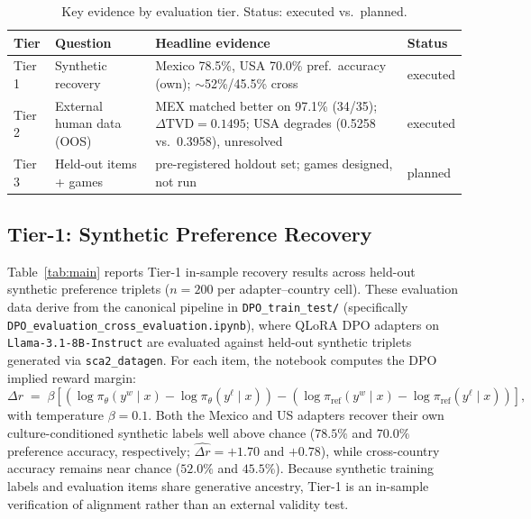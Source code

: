 \documentclass[11pt,letterpaper]{article}
\begin{document}
\begin{table}[h!]
\centering
\caption{Key evidence by evaluation tier. Status: executed vs.\ planned.}
\label{tab:evidence}
\scriptsize
\renewcommand{\arraystretch}{1.15}
\begin{tabular}{@{}llp{7.2cm}l@{}}
\toprule
\textbf{Tier} & \textbf{Question} & \textbf{Headline evidence} & \textbf{Status} \\
\midrule
Tier 1 & Synthetic recovery & Mexico 78.5\%, USA 70.0\% pref.\ accuracy (own); $\sim$52\%/45.5\% cross & executed \\
Tier 2 & External human data (OOS) & MEX matched better on 97.1\% (34/35); $\Delta\text{TVD}=0.1495$; USA degrades (0.5258 vs.\ 0.3958), unresolved & executed \\
Tier 3 & Held-out items + games & pre-registered holdout set; games designed, not run & planned \\
\bottomrule
\end{tabular}
\end{table}

\subsection{Tier-1: Synthetic Preference Recovery}

Table~\ref{tab:main} reports Tier-1 in-sample recovery results across held-out synthetic preference triplets ($n=200$ per adapter--country cell). These evaluation data derive from the canonical pipeline in \texttt{DPO\_train\_test/} (specifically \texttt{DPO\_evaluation\_cross\_evaluation.ipynb}), where QLoRA DPO adapters on \texttt{Llama-3.1-8B-Instruct} are evaluated against held-out synthetic triplets generated via \texttt{sca2\_datagen}. For each item, the notebook computes the DPO implied reward margin:
\begin{equation}
  \widehat{\Delta r} \;=\; \beta \left[ \left( \log\pi_{\theta}(y^{w}\mid x) - \log\pi_{\theta}(y^{\ell}\mid x) \right) - \left( \log\pi_{\mathrm{ref}}(y^{w}\mid x) - \log\pi_{\mathrm{ref}}(y^{\ell}\mid x) \right) \right],
\end{equation}
with temperature $\beta = 0.1$. Both the Mexico and US adapters recover their own culture-conditioned synthetic labels well above chance ($78.5\%$ and $70.0\%$ preference accuracy, respectively; $\widehat{\Delta r} = +1.70$ and $+0.78$), while cross-country accuracy remains near chance ($52.0\%$ and $45.5\%$). Because synthetic training labels and evaluation items share generative ancestry, Tier-1 is an in-sample verification of alignment rather than an external validity test.
\end{document}
